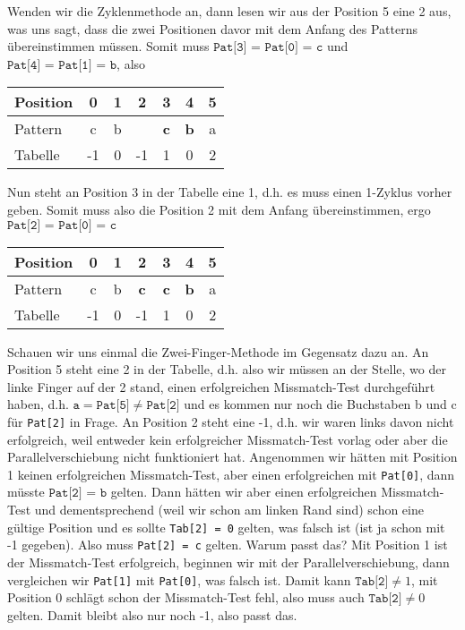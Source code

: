 \documentclass[a4paper, 12pt]{article}
\begin{document}
	Wenden wir die Zyklenmethode an, dann lesen wir aus der Position 5 eine 2 aus, was uns sagt, dass die zwei Positionen davor mit dem Anfang des Patterns übereinstimmen müssen. Somit muss $\texttt{Pat[3] = Pat[0] = c}$ und $\texttt{Pat[4] = Pat[1] = b}$, also 
	
	\begin{center}
		\begin{tabular}{l|cccccc}
			Position & 0 & 1 & 2 & 3 & 4 & 5 \\  \hline
			Pattern & c & b & & \textbf{c} & \textbf{b} & a \\ \hline
			Tabelle & -1 & 0 & -1 & 1 & 0 & 2
		\end{tabular}
	\end{center}

	Nun steht an Position 3 in der Tabelle eine 1, d.h. es muss einen 1-Zyklus vorher geben. Somit muss also die Position 2 mit dem Anfang übereinstimmen, ergo $\texttt{Pat[2] = Pat[0] = c}$
	
	\begin{center}
		\begin{tabular}{l|cccccc}
			Position & 0 & 1 & 2 & 3 & 4 & 5 \\  \hline
			Pattern & c & b & \textbf{c} & \textbf{c} & \textbf{b} & a \\ \hline
			Tabelle & -1 & 0 & -1 & 1 & 0 & 2
		\end{tabular}
	\end{center}
	
	Schauen wir uns einmal die Zwei-Finger-Methode im Gegensatz dazu an.
	An Position 5 steht eine 2 in der Tabelle, d.h. also wir müssen an der Stelle, wo der linke Finger auf der 2 stand, einen erfolgreichen Missmatch-Test durchgeführt haben, d.h. $\texttt{a} = \texttt{Pat[5]} \neq \texttt{Pat[2]}$ und es kommen nur noch die Buchstaben b und c für \texttt{Pat[2]} in Frage. An Position 2 steht eine -1, d.h. wir waren links davon nicht erfolgreich, weil entweder kein erfolgreicher Missmatch-Test vorlag oder aber die Parallelverschiebung nicht funktioniert hat. Angenommen wir hätten mit Position 1 keinen erfolgreichen Missmatch-Test, aber einen erfolgreichen mit \texttt{Pat[0]}, dann müsste $\texttt{Pat[2] = b}$ gelten. Dann hätten wir aber einen erfolgreichen Missmatch-Test und dementsprechend (weil wir schon am linken Rand sind) schon eine gültige Position und es sollte \texttt{Tab[2] = 0} gelten, was falsch ist (ist ja schon mit -1 gegeben). Also muss \texttt{Pat[2] = c} gelten. Warum passt das? Mit Position 1 ist der Missmatch-Test erfolgreich, beginnen wir mit der Parallelverschiebung, dann vergleichen wir \texttt{Pat[1]} mit \texttt{Pat[0]}, was falsch ist. Damit kann $\texttt{Tab[2]} \neq 1$, mit Position 0 schlägt schon der Missmatch-Test fehl, also muss auch $\texttt{Tab[2]} \neq 0$ gelten. Damit bleibt also nur noch -1, also passt das.
	
\end{document}
